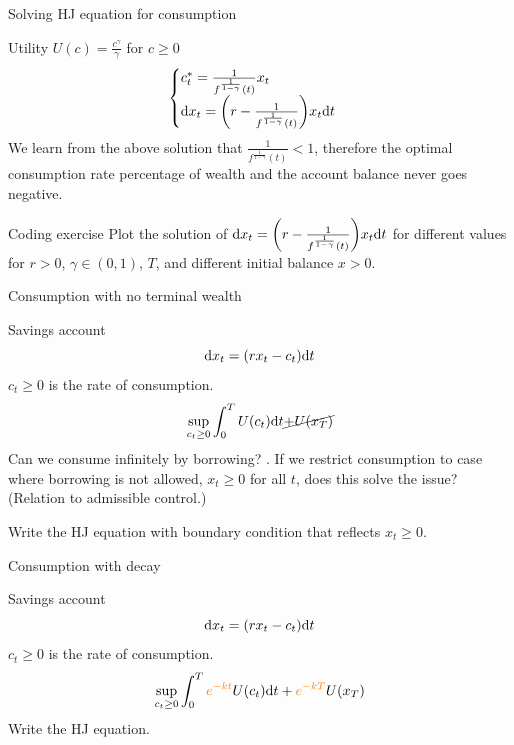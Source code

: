 \documentclass[color=usenames,dvipsnames]{beamer}
\newcommand{\dd}{\text{\normalfont d}}
\newcommand{\dt}{\text{\normalfont d}t}
\newcommand{\dx}{\text{\normalfont d}x}
\begin{document}
\begin{frame}{Solving HJ equation for consumption}
\begin{block}
    {Utility $U(c)=\frac{c^{\gamma}}{\gamma}$ for $c\ge0$} 
    \[
    \begin{cases}
       c^*_t=\frac{1}{f^{\frac{1}{1-\gamma}}(t)}x_t\\
       \dx_t = \bigg(r - \frac{1}{f^{\frac{1}{1-\gamma}}(t)}\bigg)x_t\dt
    \end{cases}
    \]
We learn from the above solution that $\frac{1}{f^{\frac{1}{1-\gamma}}(t)}<1$, therefore the optimal consumption rate percentage of wealth and the account balance never goes negative.
\end{block}

\begin{block}
    {Coding exercise}
    Plot the solution of 
    $\dx_t = \bigg(r - \frac{1}{f^{\frac{1}{1-\gamma}}(t)}\bigg)x_t\dt$
    for different values for $r>0$, $\gamma\in(0,1)$, $T$, and different initial balance $x>0.$
\end{block}

\end{frame}


\begin{frame}{Consumption with no terminal wealth}
    \begin{block}
        {Savings account}
        \[
        \dd{x}_t = (rx_t - c_t)\dt
        \]
        $c_t\ge0$ is the rate of consumption.
        \[
        \sup_{c_t\ge0} \int_0^T U(c_t)\dt \cancel{+ U(x_T)}
        \]
        Can we consume infinitely by borrowing? 
.
        If we restrict consumption to case where borrowing is not allowed, $x_t\ge0$ for all $t$, does this solve the issue? (Relation to admissible control.)

        Write the HJ equation with boundary condition that reflects $x_t\ge0$.
    \end{block}
\end{frame}


\begin{frame}{Consumption with decay}
    \begin{block}
        {Savings account}
        \[
        \dd{x}_t = (rx_t - c_t)\dt
        \]
        $c_t\ge0$ is the rate of consumption.
        \[
        \sup_{c_t\ge0} \int_0^T {\color{orange}e^{-kt}}U(c_t)\dt + {\color{orange}e^{-kT}}U(x_T)
        \]
        Write the HJ equation.
    \end{block}
\end{frame}
\end{document}
